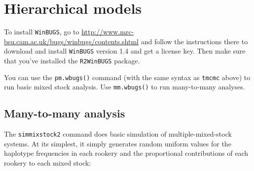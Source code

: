 \documentclass[11pt]{article}
\begin{document}
\section{Hierarchical models}

To install {\tt WinBUGS}, go to
\url{http://www.mrc-bsu.cam.ac.uk/bugs/winbugs/contents.shtml}
and follow the instructions there to download and install {\tt WinBUGS} version 1.4
and get a license key.  Then make sure that you've installed
the {\tt R2WinBUGS} package.

You can use the {\tt pm.wbugs()} command (with the same syntax
as {\tt tmcmc} above) to run basic mixed stock analysis.
Use {\tt mm.wbugs()} to run many-to-many analyses.

\subsection{Many-to-many analysis}

The {\tt simmixstock2} command does basic simulation
of multiple-mixed-stock systems.  At its simplest,
it simply generates random uniform values for
the haplotype frequencies in each rookery
and the proportional contributions of each
rookery to each mixed stock:
\end{document}
